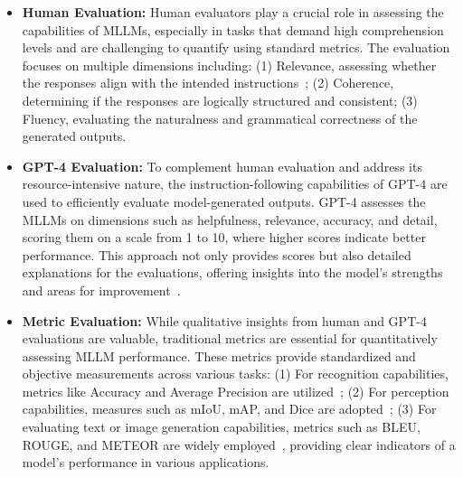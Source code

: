\begin{itemize}[leftmargin=*]
    \item \textbf{Human Evaluation:} Human evaluators play a crucial role in assessing the capabilities of MLLMs, especially in tasks that demand high comprehension levels and are challenging to quantify using standard metrics. The evaluation focuses on multiple dimensions including: 
    (1) Relevance, assessing whether the responses align with the intended instructions~\cite{liu2023llava}; 
    (2) Coherence, determining if the responses are logically structured and consistent; 
    (3) Fluency, evaluating the naturalness and grammatical correctness of the generated outputs.

    \item \textbf{GPT-4 Evaluation:} To complement human evaluation and address its resource-intensive nature, the instruction-following capabilities of GPT-4 are used to efficiently evaluate model-generated outputs. GPT-4 assesses the MLLMs on dimensions such as helpfulness, relevance, accuracy, and detail, scoring them on a scale from 1 to 10, where higher scores indicate better performance. This approach not only provides scores but also detailed explanations for the evaluations, offering insights into the model's strengths and areas for improvement~\cite{liu2023llava, achiam2023gpt}.

    \item \textbf{Metric Evaluation:} While qualitative insights from human and GPT-4 evaluations are valuable, traditional metrics are essential for quantitatively assessing MLLM performance. These metrics provide standardized and objective measurements across various tasks:
    (1) For recognition capabilities, metrics like Accuracy and Average Precision are utilized~\cite{li2023seed, li2023llava, lau2018dataset}; 
    (2) For perception capabilities, measures such as mIoU, mAP, and Dice are adopted~\cite{dai2017scannet}; 
    (3) For evaluating text or image generation capabilities, metrics such as BLEU, ROUGE, and METEOR are widely employed~\cite{kim2019audiocaps, chen2015microsoft}, providing clear indicators of a model's performance in various applications.
\end{itemize}

